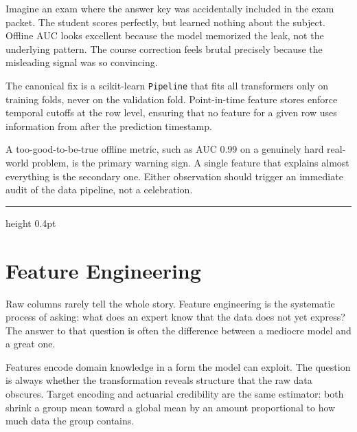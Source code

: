 \documentclass[12pt,a4paper]{article}
\begin{document}
\begin{analogy}
Imagine an exam where the answer key was accidentally included in the exam
packet. The student scores perfectly, but learned nothing about the subject.
Offline AUC looks excellent because the model memorized the leak, not the
underlying pattern. The course correction feels brutal precisely because the
misleading signal was so convincing.
\end{analogy}

The canonical fix is a scikit-learn \texttt{Pipeline} that fits all
transformers only on training folds, never on the validation fold.
Point-in-time feature stores enforce temporal cutoffs at the row level,
ensuring that no feature for a given row uses information from after the
prediction timestamp.

\begin{mentalmodel}
A too-good-to-be-true offline metric, such as AUC 0.99 on a genuinely
hard real-world problem, is the primary warning sign. A single feature
that explains almost everything is the secondary one. Either observation
should trigger an immediate audit of the data pipeline, not a celebration.
\end{mentalmodel}

\vspace{10pt}\hrule height 0.4pt\vspace{14pt}

\section*{Feature Engineering}

Raw columns rarely tell the whole story. Feature engineering is the
systematic process of asking: what does an expert know that the data
does not yet express? The answer to that question is often the difference
between a mediocre model and a great one.

\begin{concept}
Features encode domain knowledge in a form the model can exploit. The
question is always whether the transformation reveals structure that the
raw data obscures. Target encoding and actuarial credibility are the same
estimator: both shrink a group mean toward a global mean by an amount
proportional to how much data the group contains.
\end{concept}
\end{document}
